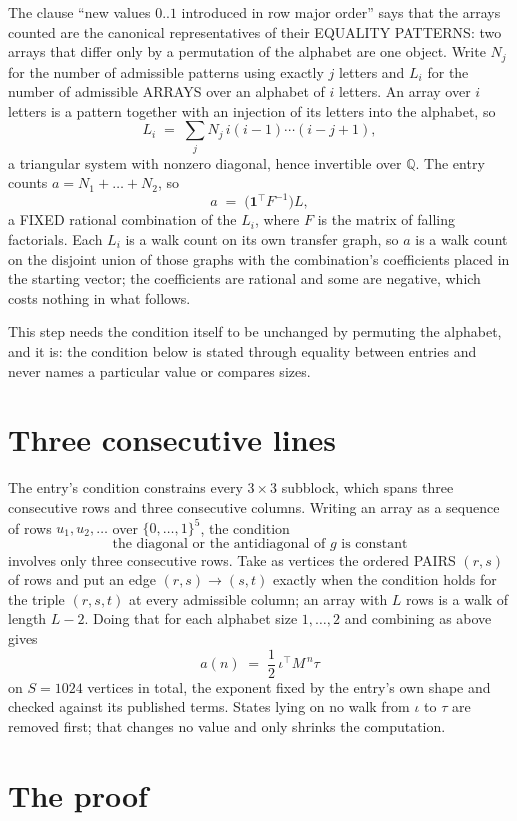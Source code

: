 \documentclass[11pt,a4paper]{article}
\theoremstyle{plain}
\theoremstyle{definition}
\begin{document}
The clause ``new values $0..1$ introduced in row major order'' says that the arrays
counted are the canonical representatives of their EQUALITY PATTERNS: two arrays that differ
only by a permutation of the alphabet are one object. Write $N_j$ for the number of admissible
patterns using exactly $j$ letters and $L_i$ for the number of admissible ARRAYS over an
alphabet of $i$ letters. An array over $i$ letters is a pattern together with an injection of
its letters into the alphabet, so
\[
L_i\;=\;\sum_{j}N_j\,i(i-1)\cdots(i-j+1),
\]
a triangular system with nonzero diagonal, hence invertible over $\mathbb{Q}$. The entry
counts $a=N_1+\dots+N_{2}$, so
\[
a\;=\;\bigl(\mathbf{1}^{\!\top}F^{-1}\bigr)L ,
\]
a FIXED rational combination of the $L_i$, where $F$ is the matrix of falling factorials.
Each $L_i$ is a walk count on its own transfer graph, so $a$ is a walk count on the disjoint
union of those graphs with the combination's coefficients placed in the starting vector; the
coefficients are rational and some are negative, which costs nothing in what follows.

This step needs the condition itself to be unchanged by permuting the alphabet, and it is:
the condition below is stated through equality between entries and never names a particular
value or compares sizes.

\section{Three consecutive lines}

The entry's condition constrains every $3\times3$ subblock, which spans three consecutive
rows and three consecutive columns. Writing an array as a sequence of rows
$u_1,u_2,\dots$ over $\{0,\dots,1\}^{5}$, the condition
\[
\text{the diagonal or the antidiagonal of }g\text{ is constant}
\]
involves only three consecutive rows. Take as vertices the ordered PAIRS $(r,s)$ of
rows and put an edge $(r,s)\to(s,t)$ exactly when the condition holds for the triple
$(r,s,t)$ at every admissible column; an array with $L$ rows is a walk of length $L-2$.
Doing that for each alphabet size $1,\dots,2$ and combining as above gives
\[
a(n)\;=\;\frac{1}{2}\,\iota^{\!\top}M^{\,n}\tau
\]
on $S=1024$ vertices in total, the exponent fixed by the entry's own shape and checked against
its published terms. States lying on no walk from $\iota$ to $\tau$ are removed first; that
changes no value and only shrinks the computation.

\section{The proof}
\end{document}

